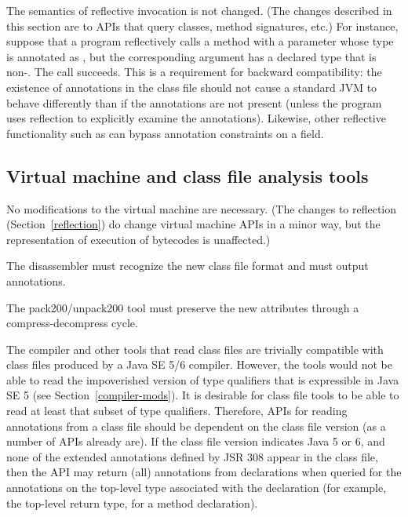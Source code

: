 \documentclass[10pt]{article}
\begin{document}
The semantics of reflective invocation is not changed.
(The changes described in this section are to APIs that query classes,
method signatures, etc.)
For instance, suppose that a program reflectively calls a method
with a parameter whose type is annotated as , but the
corresponding argument has a declared type that is non-.
The call succeeds.  This is a requirement for backward compatibility:  the
existence of annotations in the class file should not cause a standard JVM
to behave differently than if the annotations are not present (unless the
program uses reflection to explicitly examine the annotations).  Likewise,
other reflective functionality such as 
can bypass annotation constraints on a field.



\subsection{Virtual machine and class file analysis tools\label{class-file-tools}}

No modifications to the virtual machine are necessary.
(The changes to reflection (Section~\ref{reflection}) do change virtual
machine APIs in a minor way, but the representation of execution of
bytecodes is unaffected.)

The  disassembler must recognize the new class
file format and must output annotations.

The pack200/unpack200 tool must preserve the new attributes through a
compress-decompress cycle.


The compiler and other tools that read class files are trivially compatible
with class files produced by a Java SE 5/6 compiler.  However, the tools
would not be able to read the impoverished version of type qualifiers that
is expressible in Java SE 5 (see Section~\ref{compiler-mods}).  It is
desirable for class file tools to be able to read at least that subset of
type qualifiers.  Therefore, APIs for reading annotations from a class file
should be dependent on the class file version (as a number of APIs already
are).  If the class file version indicates Java 5 or 6, and none of the
extended annotations defined by JSR 308 appear in the class file, then the
API may return (all) annotations from declarations when queried for the
annotations on the top-level type associated with the declaration (for
example, the top-level return type, for a method declaration).
\end{document}
